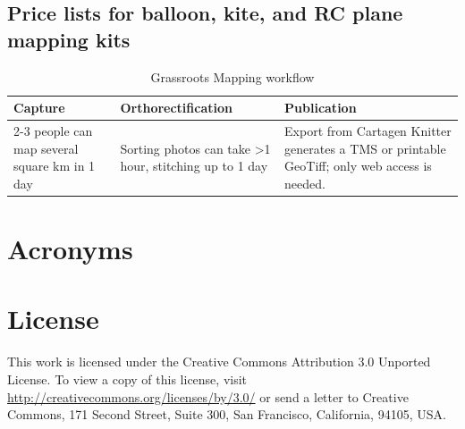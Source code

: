 \documentclass[11pt]{report}
\newcommand{\otoprule}{\midrule[\heavyrulewidth]}
\begin{document}
\section{Price lists for balloon, kite, and RC plane mapping kits}

\begin{table}[tp] 
\caption{Grassroots Mapping workflow}
\centering %
\renewcommand{\arraystretch}{1.4}
\begin{tabularx}{\textwidth}{YYY}
\toprule
Capture&Orthorectification&Publication\\\otoprule
2-3 people can map several square km in 1 day&Sorting photos can take \textgreater1 hour, stitching up to 1 day&Export from Cartagen Knitter generates a TMS or printable GeoTiff; only web access is needed.\\\bottomrule 
\end{tabularx}
\end{table}

\nocite{*}
{\small


}

\chapter*{Acronyms}

\begin{acronym}
\end{acronym}

\chapter*{License}

This work is licensed under the Creative Commons Attribution 3.0 Unported License. To view a copy of this license, visit \url{http://creativecommons.org/licenses/by/3.0/} or send a letter to Creative Commons, 171 Second Street, Suite 300, San Francisco, California, 94105, USA.
\end{document}
